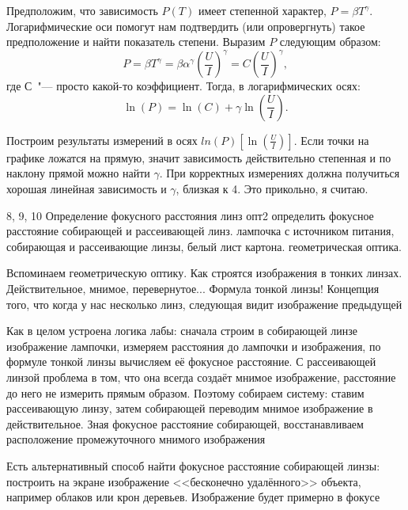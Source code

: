 \begin{enumerate}
{        \item Предположим, что зависимость $P(T)$ имеет степенной характер, $P=\beta T^\gamma$. Логарифмические оси помогут нам подтвердить (или опровергнуть) такое предположение и найти показатель степени. Выразим $P$ следующим образом:
        \begin{equation*}
            P=\beta T^\gamma = \beta \alpha^\gamma \left(\frac{U}{I}\right)^\gamma = C \left(\frac{U}{I}\right)^\gamma ,
        \end{equation*}
        где С~"--- просто какой-то коэффициент. Тогда, в логарифмических осях:
        \begin{equation*}
            \ln(P)=\ln(C) + \gamma \ln\left(\frac{U}{I}\right).
        \end{equation*}
        \item Построим результаты измерений в осях $ln(P)[\ln\left(\frac{U}{I}\right)]$. Если точки на графике ложатся на прямую, значит зависимость действительно степенная и по наклону прямой можно найти $\gamma$. При корректных измерениях должна получиться хорошая линейная зависимость и $\gamma$, близкая к 4. Это прикольно, я считаю.
        }
	\item \labtitle
		{8, 9, 10}
		{Определение фокусного расстояния линз}
		{опт2}
		{определить фокусное расстояние собирающей и рассеивающей линз.}
		{лампочка с источником питания, собирающая и рассеивающие линзы, белый лист картона.}
		{геометрическая оптика.}
		{\item Вспоминаем геометрическую оптику. Как строятся изображения в тонких линзах. Действительное, мнимое, перевернутое... Формула тонкой линзы! Концепция того, что когда у нас несколько линз, следующая видит изображение предыдущей
		\item Как в целом устроена логика лабы: сначала строим в собирающей линзе изображение лампочки, измеряем расстояния до лампочки и изображения, по формуле тонкой линзы вычисляем её фокусное расстояние. С рассеивающей линзой проблема в том, что она всегда создаёт мнимое изображение, расстояние до него не измерить прямым образом. Поэтому собираем систему: ставим рассеивающую линзу, затем собирающей переводим мнимое изображение в действительное. Зная фокусное расстояние собирающей, восстанавливаем расположение промежуточного мнимого изображения
		\item Есть альтернативный способ найти фокусное расстояние собирающей линзы: построить на экране изображение <<бесконечно удалённого>> объекта, например облаков или крон деревьев. Изображение будет примерно в фокусе
}
\end{enumerate}
